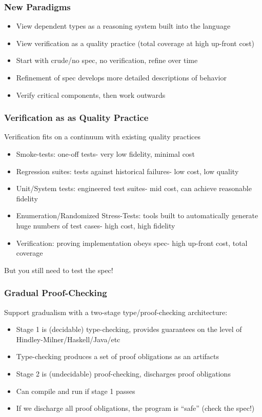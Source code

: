 \documentclass{beamer}
\begin{document}
\begin{frame}
  \frametitle{New Paradigms}
  \begin{itemize}
    \item View dependent types as a reasoning system built into the language
    \item View verification as a quality practice (total coverage at
      high up-front cost)
    \item Start with crude/no spec, no verification, refine over time
    \item Refinement of spec develops more detailed descriptions of behavior
    \item Verify critical components, then work outwards
  \end{itemize}
\end{frame}

\begin{frame}
  \frametitle{Verification as as Quality Practice}
  Verification fits on a continuum with existing quality practices
  \begin{itemize}
    \item Smoke-tests: one-off tests- very low fidelity, minimal cost
    \item Regression suites: tests against historical failures- low
      cost, low quality
    \item Unit/System tests: engineered test suites- mid cost, can
      achieve reasonable fidelity
    \item Enumeration/Randomized Stress-Tests: tools built to
      automatically generate huge numbers of test cases- high cost,
      high fidelity
    \item Verification: proving implementation obeys spec- high
      up-front cost, total coverage
  \end{itemize}
  But you still need to test the spec!
\end{frame}

\begin{frame}
  \frametitle{Gradual Proof-Checking}
  Support gradualism with a two-stage type/proof-checking architecture:
  \begin{itemize}
    \item Stage 1 is (decidable) type-checking, provides guarantees on
      the level of Hindley-Milner/Haskell/Java/etc
    \item Type-checking produces a set of proof obligations as an artifacts
    \item Stage 2 is (undecidable) proof-checking, discharges proof
      obligations
    \item Can compile and run if stage 1 passes
    \item If we discharge all proof obligations, the program is
      ``safe'' (check the spec!)
  \end{itemize}
\end{frame}
\end{document}
